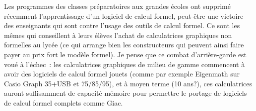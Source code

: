 \documentclass[a4paper,11pt]{book}
\begin{document}
\begin{giacjshere}
Les programmes des classes pr\'eparatoires aux grandes \'ecoles
ont supprim\'e r\'ecemment l'apprentissage d'un logiciel de calcul
formel, peut-\^etre une victoire des enseignants qui sont contre
l'usage des outils de calcul formel. Ce sont les m\^emes qui conseillent
\`a leurs \'el\`eves l'achat de calculatrices graphiques non formelles
au lyc\'ee (ce qui arrange bien les constructeurs qui peuvent ainsi
faire payer au prix fort le mod\`ele formel). 
Je pense que ce combat d'arri\`ere-garde est vou\'e \`a l'\'echec~:
les calculatrices graphiques de milieu de gamme commencent
\`a avoir des logiciels de calcul formel jouets (comme
par exemple Eigenmath sur Casio Graph 35+USB et 75/85/95),
et \`a moyen terme (10 ans?), ces calculatrices 
auront suffisamment de capacit\'e m\'emoire pour
permettre le portage de logiciels de calcul formel complets comme Giac.


\end{giacjshere}
\end{document}
